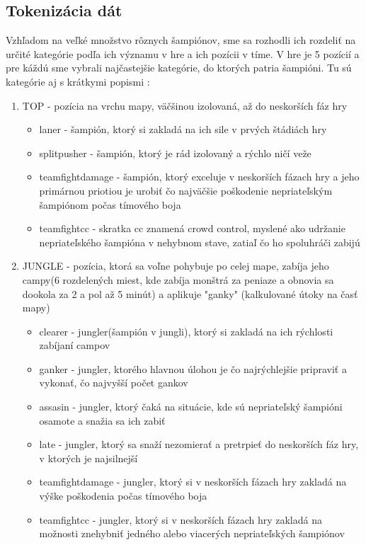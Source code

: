 \subsection{Tokenizácia dát}
Vzhľadom na veľké množstvo rôznych šampiónov, sme sa rozhodli ich rozdeliť na určité kategórie podľa ich významu v hre a ich pozícii v tíme.
V hre je 5 pozícií a pre káždú sme vybrali najčastejšie kategórie, do ktorých patria šampióni. Tu sú kategórie aj s krátkymi popismi :
\begin{enumerate}
	\item TOP - pozícia na vrchu mapy, väčšinou izolovaná, až do neskorších fáz hry
	 \begin{itemize}
		\item laner - šampión, ktorý si zakladá na ich sile v prvých štádiách hry
		\item splitpusher - šampión, ktorý je rád izolovaný a rýchlo ničí veže
		\item teamfightdamage - šampión, ktorý exceluje v neskorších fázach hry a jeho primárnou priotiou je urobiť čo najväčšie poškodenie nepriateľským šampiónom počas tímového boja
		\item teamfightcc - skratka cc znamená crowd control, myslené ako udržanie nepriateľského šampióna v nehybnom stave, zatiaľ čo ho spoluhráči zabijú
	\end{itemize}
	\item JUNGLE - pozícia, ktorá sa voľne pohybuje po celej mape, zabíja jeho campy(6 rozdelených miest, kde zabíja monštrá za peniaze a obnovia sa dookola za 2 a pol až 5 minút)  a aplikuje "ganky" (kalkulované útoky na časť mapy)
	\begin{itemize}
		\item clearer - jungler(šampión v jungli), ktorý si zakladá na ich rýchlosti zabíjaní campov
		\item ganker - jungler, ktorého hlavnou úlohou je čo najrýchlejšie pripraviť a vykonať, čo najvyšší počet gankov
		\item assasin - jungler, ktorý čaká na situácie, kde sú nepriateľský šampióni osamote a snažia sa ich zabiť
		\item late - jungler, ktorý sa snaží nezomierať a pretrpieť do neskorších fáz hry, v ktorých je najsilnejší
		\item teamfightdamage - jungler, ktorý si v neskorších fázach hry zakladá na výške poškodenia počas tímového boja
		\item teamfightcc - jungler, ktorý si v neskorších fázach hry zakladá na možnosti znehybniť jedného alebo viacerých nepriateľských šampiónov

\end{itemize}
\end{enumerate}
